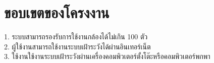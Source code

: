 \section{ขอบเขตของโครงงาน}
	1. ระบบสามารถรองรับการใช้งานกล้องได้ไม่เกิน 100 ตัว\\
	2. ผู้ใช้งานสามารถใช้งานระบบเฝ้าระวังได้ผ่านอินเทอร์เน็ต\\		
	3. ใช้งานใช้งานระบบเฝ้าระวังผ่านเครื่องคอมพิวเตอร์ตั้งโต๊ะหรือคอมพิวเตอร์พกพา\\
	